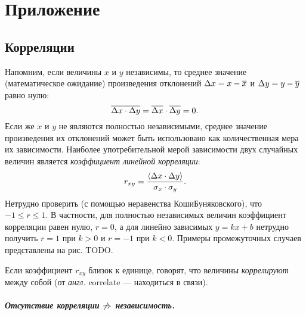\chapter{Приложение}

\small

\section{Корреляции}

Напомним, если величины $x$ и $y$ независимы, то среднее значение (математическое ожидание) произведения отклонений $\Delta x = x-\overline{x}$ и $\Delta y = y - \overline{y}$
равно нулю:
\begin{equation*}
\overline{\Delta x\cdot\Delta y}=\overline{\Delta x}\cdot\overline{\Delta
y}=0.
\end{equation*}
Если же $x$ и $y$ не являются полностью независимыми, среднее значение произведения
их отклонений может быть использовано как количественная мера их зависимости.
Наиболее употребительной мерой зависимости двух случайных величин
является \emph{коэффициент линейной корреляции}:
\begin{equation}
r_{xy}=\frac{\left<\Delta x\cdot\Delta
y\right>}{\sigma_{x}\cdot\sigma_{y}}.\label{eq:pearson}
\end{equation}
Нетрудно проверить (с помощью неравенства Коши\textendash Буняковского),
что $-1\le r\le1$. В частности, для полностью независимых величин
коэффициент корреляции равен нулю, $r=0$, а для линейно зависимых
$y=kx+b$ нетрудно получить $r=1$ при $k>0$ и $r=-1$ при $k<0$.
Примеры промежуточных случаев представлены на рис. TODO.


Если коэффициент $r_{xy}$ близок к единице, говорят, что величины
\emph{коррелируют} между собой (от \emph{англ.} correlate ---
находиться в связи).


\paragraph{Отсутствие корреляции $\protect\not\Rightarrow$ независимость.}

